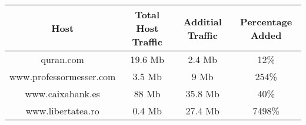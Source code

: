 \begin{table}
\begin{center}
\begin{tabular}{| c c c c |}
	\hline
	Host & Total Host Traffic & Additial Traffic & Percentage Added \\ \hline
	quran.com               & 19.6 Mb &  2.4 Mb &    12\% \\ \hline 
	www.professormesser.com & 3.5 Mb  &    9 Mb &   254\% \\ \hline 
	www.caixabank.es        & 88 Mb   & 35.8 Mb &    40\% \\ \hline 
	www.libertatea.ro       & 0.4 Mb  & 27.4 Mb &  7498\% \\ \hline 
\end{tabular}
\end{center}
\label{tab:percentage}
\end{table}
%
%												
%
%
%
%
% 
% 
